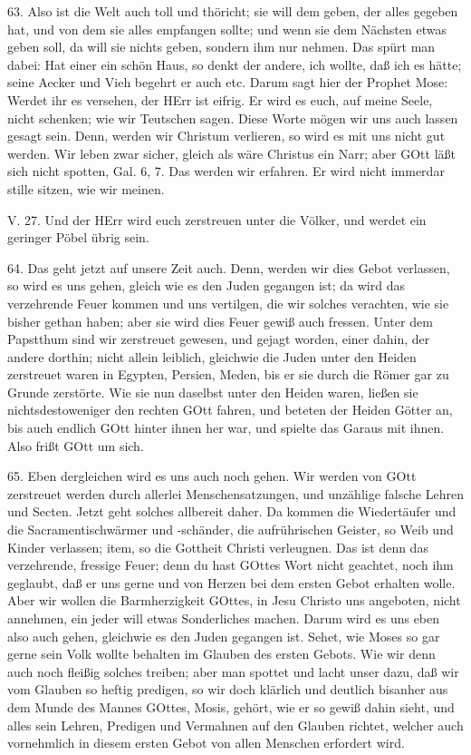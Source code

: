 63. Also ist die Welt auch toll und thöricht; sie will dem geben, der alles gegeben hat, und von dem sie alles empfangen sollte; und wenn sie dem Nächsten etwas geben soll, da will sie nichts geben, sondern ihm nur nehmen. Das spürt man dabei: Hat einer ein schön Haus, so denkt der andere, ich wollte, daß ich es hätte; seine Aecker und Vieh begehrt er auch etc. Darum sagt hier der Prophet Mose: Werdet ihr es versehen, der HErr ist eifrig. Er wird es euch, auf meine Seele, nicht schenken; wie wir Teutschen sagen. Diese Worte mögen wir uns auch lassen gesagt sein. Denn, werden wir Christum verlieren, so wird es mit uns nicht gut werden. Wir leben zwar sicher, gleich als wäre Christus ein Narr; aber GOtt läßt sich nicht spotten, Gal. 6, 7. Das werden wir erfahren. Er wird nicht immerdar stille sitzen, wie wir meinen.

\begin{schriftzitat}
V. 27. Und der HErr wird euch zerstreuen unter die Völker, und werdet ein geringer Pöbel übrig sein.
\end{schriftzitat}

64. Das geht jetzt auf unsere Zeit auch. Denn, werden wir dies Gebot verlassen, so wird es uns gehen, gleich wie es den Juden gegangen ist;
da wird das verzehrende Feuer kommen und uns vertilgen, die wir solches verachten, wie sie bisher gethan haben; aber sie wird dies Feuer gewiß auch fressen. Unter dem Papstthum sind wir zerstreuet gewesen, und gejagt worden, einer dahin, der andere dorthin; nicht allein leiblich, gleichwie die Juden unter den Heiden zerstreuet waren in Egypten, Persien, Meden, bis er sie durch die Römer gar zu Grunde zerstörte. Wie sie nun daselbst unter den Heiden waren, ließen sie nichtsdestoweniger den rechten GOtt fahren, und beteten der Heiden Götter an, bis auch endlich GOtt hinter ihnen her war, und spielte das Garaus mit ihnen. Also frißt GOtt um sich.

65. Eben dergleichen wird es uns auch noch gehen. Wir werden von GOtt zerstreuet werden durch allerlei Menschensatzungen, und unzählige falsche Lehren und Secten. Jetzt geht solches allbereit daher. Da kommen die Wiedertäufer und die Sacramentischwärmer und -schänder, die aufrührischen Geister, so Weib und Kinder verlassen; item, so die Gottheit Christi verleugnen. Das ist denn das verzehrende, fressige Feuer; denn du hast GOttes Wort nicht geachtet, noch ihm geglaubt, daß er uns gerne und von Herzen bei dem ersten Gebot erhalten wolle. Aber wir wollen die Barmherzigkeit GOttes, in Jesu Christo uns angeboten, nicht annehmen, ein jeder will etwas Sonderliches machen. Darum wird es uns eben also auch gehen, gleichwie es den Juden gegangen ist. Sehet, wie Moses so gar gerne sein Volk wollte behalten im Glauben des ersten Gebots. Wie wir denn auch noch fleißig solches treiben; aber man spottet und lacht unser dazu, daß wir vom Glauben so heftig predigen, so wir doch klärlich und deutlich bisanher aus dem Munde des Mannes GOttes, Mosis, gehört, wie er so gewiß dahin sieht, und alles sein Lehren, Predigen und Vermahnen auf den Glauben richtet, welcher auch vornehmlich in diesem ersten Gebot von allen Menschen erfordert wird.

